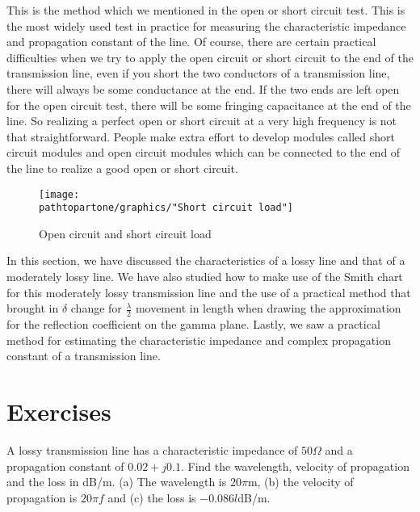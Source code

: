 This is the method which we mentioned in the open or short circuit test. This is the most widely used test in practice for measuring the characteristic impedance and propagation constant of the line. Of course, there are certain practical difficulties when we try to apply the open circuit or short circuit to the end of the transmission line, even if you short the two conductors of a transmission line, there will always be some conductance at the end. If the two ends are left open for the open circuit test, there will be some fringing capacitance at the end of the line. So realizing a perfect open or short circuit at a very high frequency is not that straightforward. People make extra effort to develop modules called short circuit modules and open circuit modules which can be connected to the end of the line to realize a good open or short circuit.
\begin{figure}[h]
\centering
\texttt{[image: \\pathtopartone/graphics/"Short circuit load"]}
\caption{Open circuit and short circuit load}
\end{figure}

In this section, we have discussed the characteristics of a lossy line and that of a moderately lossy line. We have also studied how to make use of the Smith chart for this moderately lossy transmission line and the use of a practical method that brought in $\delta$ change for $\frac{\lambda}{2}$ movement in length when drawing the approximation for the reflection coefficient on the gamma plane. Lastly, we saw a practical method for estimating the characteristic impedance and complex propagation constant of a transmission line.

\section*{Exercises}
\begin{ExerciseList}
\Exercise[label={ex131}]
A lossy transmission line has a characteristic impedance of $50\varOmega$ and a propagation constant of $0.02 + j0.1$. Find the wavelength, velocity of propagation and the loss in dB/m.
\Answer[ref={ex131}]
(a) The wavelength is $20\pi$m, (b) the velocity of propagation is $20\pi f$ and (c) the loss is $-0.086l$dB/m.
\end{ExerciseList}
